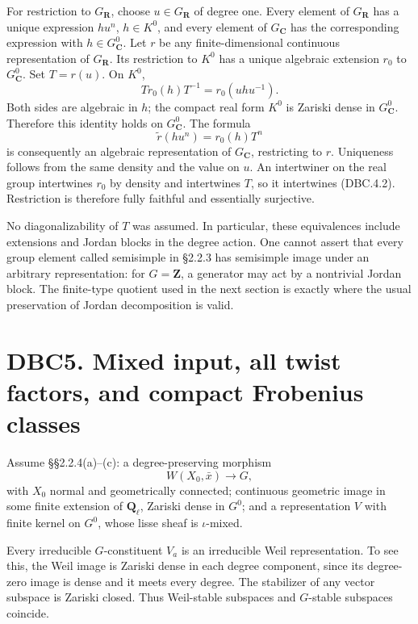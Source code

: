 \documentclass[
]{report}
\begin{document}
For restriction to \(G_{\mathbf R}\), choose \(u\in G_{\mathbf R}\) of
degree one. Every element of \(G_{\mathbf R}\) has a unique expression
\(h u^n\), \(h\in K^0\), and every element of \(G_{\mathbf C}\) has the
corresponding expression with \(h\in G_{\mathbf C}^{0}\). Let \(r\) be
any finite-dimensional continuous representation of \(G_{\mathbf R}\).
Its restriction to \(K^0\) has a unique algebraic extension \(r_0\) to
\(G_{\mathbf C}^{0}\). Set \(T=r(u)\). On \(K^0\), \[
T r_0(h)T^{-1}=r_0(u h u^{-1}).
\] Both sides are algebraic in \(h\); the compact real form \(K^0\) is
Zariski dense in \(G_{\mathbf C}^{0}\). Therefore this identity holds on
\(G_{\mathbf C}^{0}\). The formula \[
\widetilde r(h u^n)=r_0(h)T^n
\tag{DBC.4.2}
\] is consequently an algebraic representation of \(G_{\mathbf C}\),
restricting to \(r\). Uniqueness follows from the same density and the
value on \(u\). An intertwiner on the real group intertwines \(r_0\) by
density and intertwines \(T\), so it intertwines (DBC.4.2). Restriction
is therefore fully faithful and essentially surjective.

No diagonalizability of \(T\) was assumed. In particular, these
equivalences include extensions and Jordan blocks in the degree action.
One cannot assert that every group element called semisimple in §2.2.3
has semisimple image under an arbitrary representation: for
\(G=\mathbf Z\), a generator may act by a nontrivial Jordan block. The
finite-type quotient used in the next section is exactly where the usual
preservation of Jordan decomposition is valid.

\section{DBC5. Mixed input, all twist factors, and compact Frobenius
classes}\label{dbc5.-mixed-input-all-twist-factors-and-compact-frobenius-classes}

Assume §§2.2.4(a)--(c): a degree-preserving morphism \[
W(X_0,\bar x)\longrightarrow G,
\] with \(X_0\) normal and geometrically connected; continuous geometric
image in some finite extension of \(\mathbf Q_\ell\), Zariski dense in
\(G^0\); and a representation \(V\) with finite kernel on \(G^0\), whose
lisse sheaf is \(\iota\)-mixed.

Every irreducible \(G\)-constituent \(V_a\) is an irreducible Weil
representation. To see this, the Weil image is Zariski dense in each
degree component, since its degree-zero image is dense and it meets
every degree. The stabilizer of any vector subspace is Zariski closed.
Thus Weil-stable subspaces and \(G\)-stable subspaces coincide.
\end{document}
